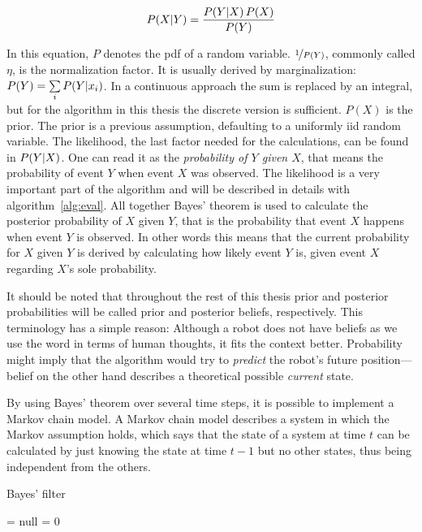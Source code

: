 \documentclass[Thesis.tex]{subfiles}
\begin{document}
\begin{align}
\p[P]{X}{Y} = \frac{ \p[P]{Y}{X} P(X) } { P(Y) }
\end{align}

In this equation, $P$ denotes the \gls{pdf} of a random variable. $\nicefrac{1}{P(Y)}$, commonly called $\eta$, is the normalization factor. It is usually derived by marginalization: $P(Y) = \sum\limits_i \p[P]{Y}{x_i}$. In a continuous approach the sum is replaced by an integral, but for the algorithm in this thesis the discrete version is sufficient. $P(X)$ is the prior. The prior is a previous assumption, defaulting to a uniformly \gls{iid} random variable. The likelihood, the last factor needed for the calculations, can be found in $\p[P]{Y}{X}$. One can read it as the \emph{probability of $Y$ given $X$}, that means the probability of event $Y$ when event $X$ was observed. 
The likelihood is a very important part of the algorithm and will be described in details with algorithm~\ref{alg:eval}. All together Bayes' theorem is used to calculate the posterior probability of $X$ given $Y$, that is the probability that event $X$ happens when event $Y$ is observed. In other words this means that the current probability for $X$ given $Y$ is derived by calculating how likely event $Y$ is, given event $X$ regarding $X$'s sole probability. 

It should be noted that throughout the rest of this thesis prior and posterior probabilities will be called prior and posterior beliefs, respectively. This terminology has a simple reason: Although a robot does not have beliefs as we use the word in terms of human thoughts, it fits the context better. Probability might imply that the algorithm would try to \emph{predict} the robot's future position---belief on the other hand describes a theoretical possible \emph{current} state.

\bigskip

By using Bayes' theorem over several time steps, it is possible to implement a Markov chain model. A Markov chain model describes a system in which the Markov assumption holds, which says that the state of a system at time $t$ can be calculated by just knowing the state at time $t-1$ but no other states, thus being independent from the others.

\begin{algorithm}
\caption{Bayes' filter}
\label{alg:bayesfilter}

\bayesfilter{} {
  \guess = null\;
  \belief = 0\;
}
\end{algorithm}
\end{document}
